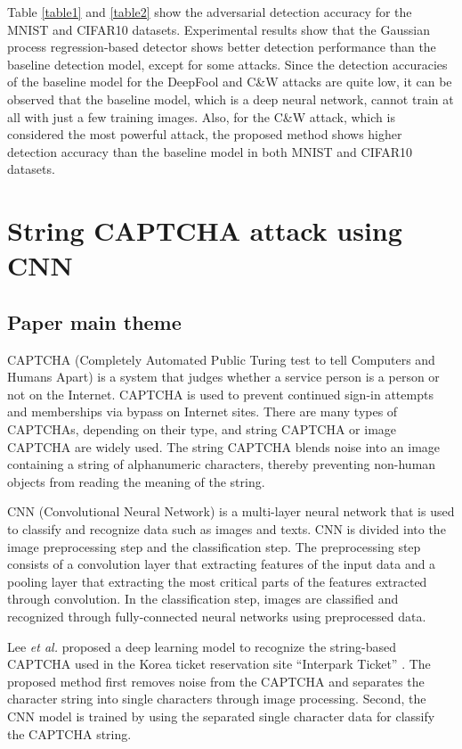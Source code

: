 \documentclass{ieeeaccess}
\begin{document}
Table \ref{table1} and \ref{table2} show the adversarial detection accuracy for the MNIST and CIFAR10 datasets. Experimental results show that the Gaussian process regression-based detector shows better detection performance than the baseline detection model, except for some attacks. Since the detection accuracies of the baseline model for the DeepFool and C\&W attacks are quite low, it can be observed that the baseline model, which is a deep neural network, cannot train at all with just a few training images. Also, for the C\&W attack, which is considered the most powerful attack, the proposed method shows higher detection accuracy than the baseline model in both MNIST and CIFAR10 datasets.


\section{String CAPTCHA attack using CNN}
\label{second}
\subsection{Paper main theme}
CAPTCHA (Completely Automated Public Turing test to tell Computers and Humans Apart) is a system that judges whether a service person is a person or not on the Internet.
CAPTCHA is used to prevent continued sign-in attempts and memberships via bypass on Internet sites.
There are many types of CAPTCHAs, depending on their type, and string CAPTCHA or image CAPTCHA are widely used.
The string CAPTCHA blends noise into an image containing a string of alphanumeric characters, thereby preventing non-human objects from reading the meaning of the string.

CNN (Convolutional Neural Network) is a multi-layer neural network that is used to classify and recognize data such as images and texts. 
CNN is divided into the image preprocessing step and the classification step. 
The preprocessing step consists of a convolution layer that extracting features of the input data and a pooling layer that extracting the most critical parts of the features extracted through convolution. 
In the classification step, images are classified and recognized through fully-connected neural networks using preprocessed data.

Lee \textit{et al.} proposed a deep learning model to recognize the string-based CAPTCHA used in the Korea ticket reservation site ``Interpark Ticket'' \cite{paper2}.
The proposed method first removes noise from the CAPTCHA and separates the character string into single characters through image processing.
Second, the CNN model is trained by using the separated single character data for classify the CAPTCHA string.
\end{document}

